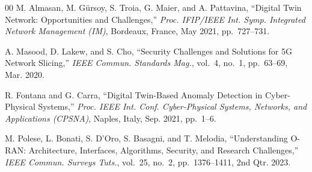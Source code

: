\documentclass[conference]{IEEEtran}
\begin{document}
\begin{thebibliography}{00}
M. Almasan, M. Gürsoy, S. Troia, G. Maier, and A. Pattavina,
``Digital Twin Network: Opportunities and Challenges,''
\emph{Proc. IFIP/IEEE Int. Symp. Integrated Network Management (IM)},
Bordeaux, France, May 2021, pp.~727--731.

A. Masood, D. Lakew, and S. Cho,
``Security Challenges and Solutions for 5G Network Slicing,''
\emph{IEEE Commun. Standards Mag.},
vol.~4, no.~1, pp.~63--69, Mar. 2020.

R. Fontana and G. Carra,
``Digital Twin-Based Anomaly Detection in Cyber-Physical Systems,''
\emph{Proc. IEEE Int. Conf. Cyber-Physical Systems, Networks, and
Applications (CPSNA)},
Naples, Italy, Sep. 2021, pp.~1--6.

M. Polese, L. Bonati, S. D'Oro, S. Basagni, and T. Melodia,
``Understanding O-RAN: Architecture, Interfaces, Algorithms, Security,
and Research Challenges,''
\emph{IEEE Commun. Surveys Tuts.},
vol.~25, no.~2, pp.~1376--1411, 2nd Qtr. 2023.

\end{thebibliography}
\end{document}
